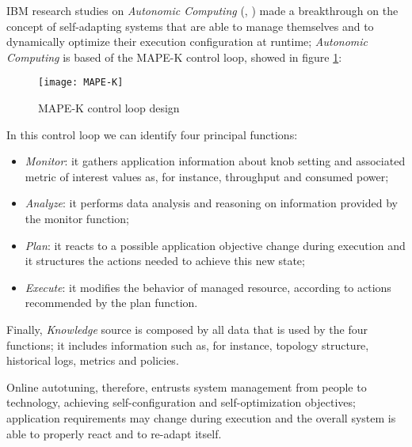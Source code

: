 IBM research studies on \textit{Autonomic Computing} (\cite{kephart2003vision}, \cite{computing2006architectural}) made a breakthrough on the concept of self-adapting systems that are able to manage themselves and to dynamically optimize their execution configuration at runtime; \textit{Autonomic Computing} is based of the MAPE-K control loop, showed in figure \ref{fig::mape-k}:

\begin{figure}[H]

    \centering
    \texttt{[image: MAPE-K]}
    \caption{MAPE-K control loop design}
    \label{fig::mape-k}

\end{figure}

In this control loop we can identify four principal functions:

\begin{itemize}

    \item \textit{Monitor}: it gathers application information about knob setting and associated metric of interest values as, for instance, throughput and consumed power;
    
    \item \textit{Analyze}: it performs data analysis and reasoning on information provided by the monitor function;
    
    \item \textit{Plan}: it reacts to a possible application objective change during execution and it structures the actions needed to achieve this new state;
    
    \item \textit{Execute}: it modifies the behavior of managed resource, according to actions recommended by the plan function.

\end{itemize}

Finally, \textit{Knowledge} source is composed by all data that is used by the four functions; it includes information such as, for instance, topology structure, historical logs, metrics and policies.

Online autotuning, therefore, entrusts system management from people to technology, achieving self-configuration and self-op\-ti\-mi\-za\-tion objectives; application requirements may change during execution and the overall system is able to properly react and to re-adapt itself.





